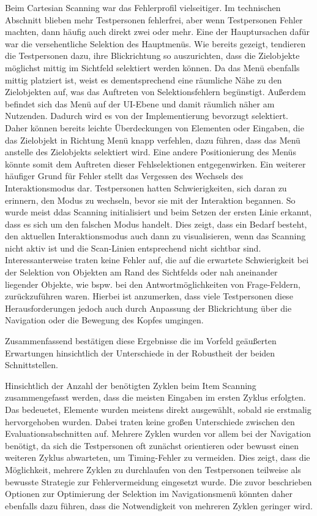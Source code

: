 Beim Cartesian Scanning war das Fehlerprofil vielseitiger. Im technischen Abschnitt blieben mehr Testpersonen fehlerfrei, aber wenn Testpersonen Fehler machten, dann häufig auch direkt zwei oder mehr. Eine der Hauptursachen dafür war die versehentliche Selektion des Hauptmenüs. Wie bereits gezeigt, tendieren die Testpersonen dazu, ihre Blickrichtung so auszurichten, dass die Zielobjekte möglichst mittig im Sichtfeld selektiert werden können. Da das Menü ebenfalls mittig platziert ist, weist es dementsprechend eine räumliche Nähe zu den Zielobjekten auf, was das Auftreten von Selektionsfehlern begünstigt. Außerdem befindet sich das Menü auf der UI-Ebene und damit räumlich näher am Nutzenden. Dadurch wird es von der Implementierung bevorzugt selektiert. Daher können bereits leichte Überdeckungen von Elementen oder Eingaben, die das Zielobjekt in Richtung Menü knapp verfehlen, dazu führen, dass das Menü anstelle des Zielobjekts selektiert wird. Eine andere Positionierung des Menüs könnte somit dem Auftreten dieser Fehlselektionen entgegenwirken. 
Ein weiterer häufiger Grund für Fehler stellt das Vergessen des Wechsels des Interaktionsmodus dar. Testpersonen hatten Schwierigkeiten, sich daran zu erinnern, den Modus zu wechseln, bevor sie mit der Interaktion begannen. So wurde meist ddas Scanning initialisiert und beim Setzen der ersten Linie erkannt, dass es sich um den falschen Modus handelt. Dies zeigt, dass ein Bedarf besteht, den aktuellen Interaktionsmodus auch dann zu visualisieren, wenn das Scanning nicht aktiv ist und die Scan-Linien entsprechend nicht sichtbar sind.
Interessanterweise traten keine Fehler auf, die auf die erwartete Schwierigkeit bei der Selektion von Objekten am Rand des Sichtfelds oder nah aneinander liegender Objekte, wie bspw. bei den Antwortmöglichkeiten von Frage-Feldern, zurückzuführen waren. Hierbei ist anzumerken, dass viele Testpersonen diese Herausforderungen jedoch auch durch Anpassung der Blickrichtung über die Navigation oder die Bewegung des Kopfes umgingen. 

Zusammenfassend bestätigen diese Ergebnisse die im Vorfeld geäußerten Erwartungen hinsichtlich der Unterschiede in der Robustheit der beiden Schnittstellen.

Hinsichtlich der Anzahl der benötigten Zyklen beim Item Scanning zusammengefasst werden, dass die meisten Eingaben im ersten Zyklus erfolgten. Das bedeuetet, Elemente wurden meistens direkt ausgewählt, sobald sie erstmalig hervorgehoben wurden. Dabei traten keine großen Unterschiede zwischen den Evaluationsabschnitten auf. Mehrere Zyklen wurden vor allem bei der Navigation benötigt, da sich die Testpersonen oft zunächst orientieren oder bewusst einen weiteren Zyklus abwarteten, um Timing-Fehler zu vermeiden. Dies zeigt, dass die Möglichkeit, mehrere Zyklen zu durchlaufen von den Testpersonen teilweise als bewusste Strategie zur Fehlervermeidung eingesetzt wurde. Die zuvor beschrieben Optionen zur Optimierung der Selektion im Navigationsmenü könnten daher ebenfalls dazu führen, dass die Notwendigkeit von mehreren Zyklen geringer wird.  

